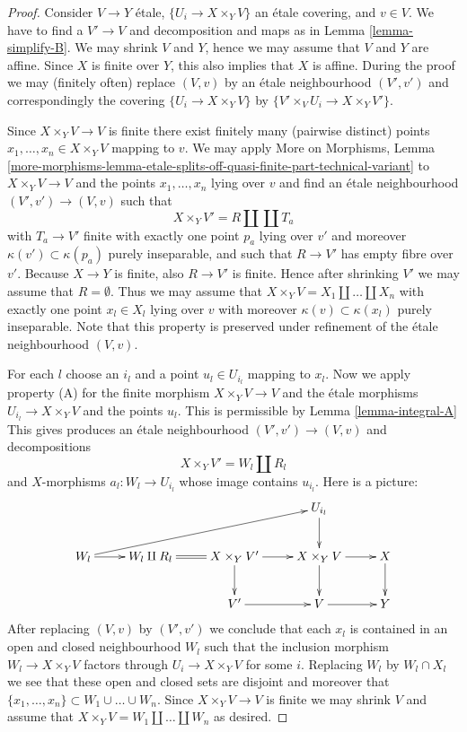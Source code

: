\documentclass[10pt,a4paper]{amsart}
\theoremstyle{plain}
\theoremstyle{definition}
\theoremstyle{remark}
\numberwithin{equation}{subsection}
\begin{document}
\begin{proof}
Consider $V \to Y$ \'etale, $\{U_i \to X \times_Y V\}$ an \'etale covering, and
$v \in V$. We have to find a $V' \to V$ and decomposition and maps as in
Lemma \ref{lemma-simplify-B}.
We may shrink $V$ and $Y$, hence we may assume that $V$ and $Y$ are affine.
Since $X$ is finite over $Y$, this also implies that $X$ is affine.
During the proof we may (finitely often) replace $(V, v)$ by an
\'etale neighbourhood $(V', v')$ and correspondingly the covering
$\{U_i \to X \times_Y V\}$ by $\{V' \times_V U_i \to X \times_Y V'\}$.

\medskip\noindent
Since $X \times_Y V \to V$ is finite there exist finitely
many (pairwise distinct) points $x_1, \ldots, x_n \in X \times_Y V$
mapping to $v$. We may apply
More on Morphisms, Lemma
\ref{more-morphisms-lemma-etale-splits-off-quasi-finite-part-technical-variant}
to $X \times_Y V \to V$ and the points $x_1, \ldots, x_n$ lying over
$v$ and find an \'etale neighbourhood $(V', v') \to (V, v)$
such that
$$
X \times_Y V' = R \amalg \coprod T_a
$$
with $T_a \to V'$ finite with exactly one point $p_a$ lying over $v'$
and moreover $\kappa(v') \subset \kappa(p_a)$ purely inseparable, and
such that $R \to V'$ has empty fibre over $v'$.
Because $X \to Y$ is finite, also $R \to V'$ is finite. Hence after
shrinking $V'$ we may assume that $R = \emptyset$. Thus we may
assume that $X \times_Y V = X_1 \amalg \ldots \amalg X_n$ with
exactly one point $x_l \in X_l$ lying over $v$ with moreover
$\kappa(v) \subset \kappa(x_l)$ purely inseparable. Note that this
property is preserved under refinement of the \'etale neighbourhood
$(V, v)$.

\medskip\noindent
For each $l$ choose an $i_l$ and a point $u_l \in U_{i_l}$ mapping to $x_l$.
Now we apply property (A) for the finite morphism
$X \times_Y V \to V$ and the \'etale
morphisms $U_{i_l} \to X \times_Y V$ and the points $u_l$.
This is permissible by
Lemma \ref{lemma-integral-A}
This gives produces an \'etale neighbourhood $(V', v') \to (V, v)$
and decompositions
$$
X \times_Y V' = W_l \amalg R_l
$$
and $X$-morphisms $a_l : W_l \to U_{i_l}$ whose image contains $u_{i_l}$.
Here is a picture:
$$
\xymatrix{
& & & U_{i_l} \ar[d] & \\
W_l \ar[rrru] \ar[r] & W_l \amalg R_l \ar@{=}[r] &
X \times_Y V' \ar[r] \ar[d] &
X \times_Y V \ar[r] \ar[d] & X \ar[d] \\
& & V' \ar[r] & V \ar[r] & Y
}
$$
After replacing $(V, v)$ by $(V', v')$ we conclude that each
$x_l$ is contained in an open and closed neighbourhood $W_l$ such that
the inclusion morphism $W_l \to X \times_Y V$ factors through
$U_i \to X \times_Y V$ for some $i$. Replacing $W_l$ by $W_l \cap X_l$
we see that these open and closed sets are disjoint and moreover
that $\{x_1, \ldots, x_n\} \subset W_1 \cup \ldots \cup W_n$.
Since $X \times_Y V \to V$ is finite we may shrink $V$ and assume that
$X \times_Y V = W_1 \amalg \ldots \amalg W_n$ as desired.
\end{proof}
\end{document}
